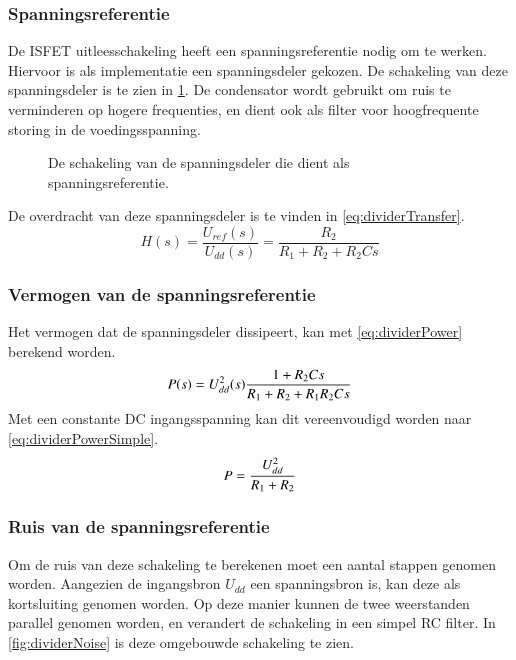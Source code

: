 \subsubsection{Spanningsreferentie}\label{sec:referenceVoltage}
De ISFET uitleesschakeling heeft een spanningsreferentie nodig om te werken.
Hiervoor is als implementatie een spanningsdeler gekozen. De schakeling van deze spanningsdeler is te zien in \cref{fig:divider}.
De condensator wordt gebruikt om ruis te verminderen op hogere frequenties, en dient ook als filter voor hoogfrequente storing in de voedingsspanning.

\begin{figure}[!htbp]
    \centering
    \def\svgwidth{0.5\textwidth}
    
    \caption{De schakeling van de spanningsdeler die dient als spanningsreferentie.}
    \label{fig:divider}
\end{figure}

De overdracht van deze spanningsdeler is te vinden in \cref{eq:dividerTransfer}.
\begin{equation}\label{eq:dividerTransfer}
    H(s) = \frac{U_{ref}(s)}{U_{dd}(s)} = \frac{R_2}{R_1 + R_2 + R_2Cs}
\end{equation}

\subsubsection{Vermogen van de spanningsreferentie}
Het vermogen dat de spanningsdeler dissipeert, kan met \cref{eq:dividerPower} berekend worden.
\begin{equation}\label{eq:dividerPower}
    P(s) = U_{dd}^2(s)\frac{1+R_2Cs}{R_1 + R_2 + R_1R_2Cs}
    \tagaddtext{[\si{\watt}]}
\end{equation}
Met een constante DC ingangsspanning kan dit vereenvoudigd worden naar \cref{eq:dividerPowerSimple}.
\begin{equation}\label{eq:dividerPowerSimple}
    P = \frac{U_{dd}^2}{R_1 + R_2}
    \tagaddtext{[\si{\watt}]}
\end{equation}

\subsubsection{Ruis van de spanningsreferentie}
Om de ruis van deze schakeling te berekenen moet een aantal stappen genomen worden. Aangezien de ingangsbron $U_{dd}$ een spanningsbron is, kan deze als kortsluiting genomen worden. Op deze manier kunnen de twee weerstanden parallel genomen worden, en verandert de schakeling in een simpel RC filter. In \cref{fig:dividerNoise} is deze omgebouwde schakeling te zien.


